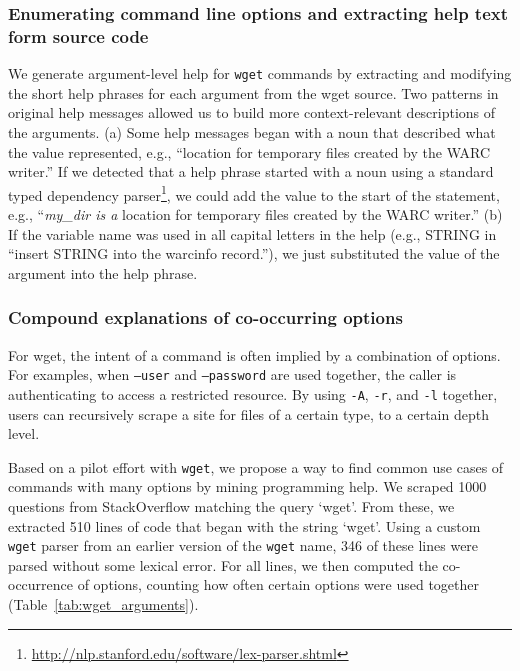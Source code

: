 \subsubsection{Enumerating command line options and extracting help text form source code}

We generate argument-level help for \texttt{wget} commands by extracting and modifying the short help phrases for each argument from the wget source.
Two patterns in original help messages allowed us to build more context-relevant descriptions of the arguments.
(a) Some help messages began with a noun that described what the value represented, e.g., ``location for temporary files created by the WARC writer.''
If we detected that a help phrase started with a noun using a standard typed dependency parser\footnote{\url{http://nlp.stanford.edu/software/lex-parser.shtml}}, we could add the value to the start of the statement, e.g., ``\emph{my\_dir is a} location for temporary files created by the WARC writer.''
(b) If the variable name was used in all capital letters in the help (e.g., STRING in ``insert STRING into the warcinfo record.''), we just substituted the value of the argument into the help phrase.

\subsubsection{Compound explanations of co-occurring options}

For wget, the intent of a command is often implied by a combination of options.
For examples, when \texttt{--user} and \texttt{--password} are used together, the caller is authenticating to access a restricted resource.
By using \texttt{-A}, \texttt{-r}, and \texttt{-l} together, users can recursively scrape a site for files of a certain type, to a certain depth level.

Based on a pilot effort with \texttt{wget}, we propose a way to find common use cases of commands with many options by mining programming help.
We scraped 1000 questions from StackOverflow matching the query `wget'.
From these, we extracted 510 lines of code that began with the string `wget'.
Using a custom \texttt{wget} parser from an earlier version of the \texttt{wget} \gls{name}, 346 of these lines were parsed without some lexical error.
For all lines, we then computed the co-occurrence of options, counting how often certain options were used together (Table~\ref{tab:wget_arguments}).

